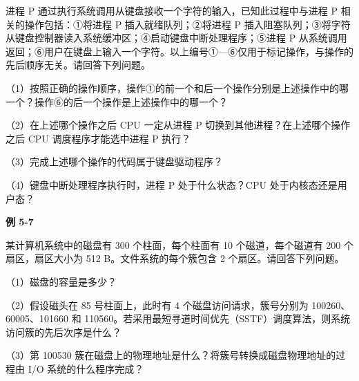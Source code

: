 进程 P 通过执行系统调用从键盘接收一个字符的输入，已知此过程中与进程 P 相关的操作包括：{\SNsymbolfont ①}将进程 P 插入就绪队列；{\SNsymbolfont ②}将进程 P 插入阻塞队列；{\SNsymbolfont ③}将字符从键盘控制器读入系统缓冲区；{\SNsymbolfont ④}启动键盘中断处理程序；{\SNsymbolfont ⑤}进程 P 从系统调用返回；{\SNsymbolfont ⑥}用户在键盘上输入一个字符。以上编号{\SNsymbolfont ①}---{\SNsymbolfont ⑥}仅用于标记操作，与操作的先后顺序无关。请回答下列问题。

（1）按照正确的操作顺序，操作{\SNsymbolfont ①}的前一个和后一个操作分别是上述操作中的哪一个？操作{\SNsymbolfont ⑥}的后一个操作是上述操作中的哪一个？

（2）在上述哪个操作之后 CPU 一定从进程 P 切换到其他进程？在上述哪个操作之后 CPU 调度程序才能选中进程 P 执行？

（3）完成上述哪个操作的代码属于键盘驱动程序？

（4）键盘中断处理程序执行时，进程 P 处于什么状态？CPU 处于内核态还是用户态？

\par\medskip{}\noindent\hypertarget{OS05-E07}{}\label{OS05-E07}\textbf{例 5-7}\par\nobreak\smallskip

某计算机系统中的磁盘有 300 个柱面，每个柱面有 10 个磁道，每个磁道有 200 个扇区，扇区大小为 512 B。文件系统的每个簇包含 2 个扇区。请回答下列问题。

（1）磁盘的容量是多少？

（2）假设磁头在 85 号柱面上，此时有 4 个磁盘访问请求，簇号分别为 100260、60005、101660 和 110560。若采用最短寻道时间优先（SSTF）调度算法，则系统访问簇的先后次序是什么？

（3）第 100530 簇在磁盘上的物理地址是什么？将簇号转换成磁盘物理地址的过程由 I/O 系统的什么程序完成？
